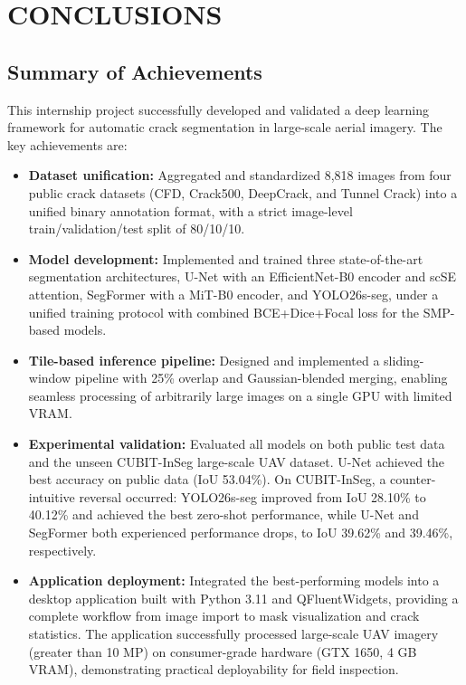 \chapter{CONCLUSIONS}

\section{Summary of Achievements}
\label{sec:summary_achievements}

\hs This internship project successfully developed and validated a deep learning framework for automatic crack segmentation in large-scale aerial imagery. The key achievements are:

\begin{itemize}
	\item \textbf{Dataset unification:} Aggregated and standardized 8,818 images from four public crack datasets (CFD, Crack500, DeepCrack, and Tunnel Crack) into a unified binary annotation format, with a strict image-level train/validation/test split of 80/10/10.
	\item \textbf{Model development:} Implemented and trained three state-of-the-art segmentation architectures, U-Net with an EfficientNet-B0 encoder and scSE attention, SegFormer with a MiT-B0 encoder, and YOLO26s-seg, under a unified training protocol with combined BCE+Dice+Focal loss for the SMP-based models.
	\item \textbf{Tile-based inference pipeline:} Designed and implemented a sliding-window pipeline with 25\% overlap and Gaussian-blended merging, enabling seamless processing of arbitrarily large images on a single GPU with limited VRAM.
	\item \textbf{Experimental validation:} Evaluated all models on both public test data and the unseen CUBIT-InSeg large-scale UAV dataset. U-Net achieved the best accuracy on public data (IoU 53.04\%). On CUBIT-InSeg, a counter-intuitive reversal occurred: YOLO26s-seg improved from IoU 28.10\% to 40.12\% and achieved the best zero-shot performance, while U-Net and SegFormer both experienced performance drops, to IoU 39.62\% and 39.46\%, respectively.
	\item \textbf{Application deployment:} Integrated the best-performing models into a desktop application built with Python 3.11 and QFluentWidgets, providing a complete workflow from image import to mask visualization and crack statistics. The application successfully processed large-scale UAV imagery (greater than 10 MP) on consumer-grade hardware (GTX 1650, 4 GB VRAM), demonstrating practical deployability for field inspection.
\end{itemize}

